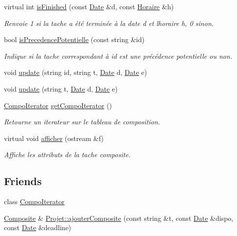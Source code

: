 \begin{DoxyCompactItemize}
virtual int \hyperlink{class_composite_a4dd23b6bafdc87f05f0cb7d19e459f94}{is\+Finished} (const \hyperlink{class_t_i_m_e_1_1_date}{Date} \&d, const \hyperlink{class_t_i_m_e_1_1_horaire}{Horaire} \&h)
\begin{DoxyCompactList}\small\item\em Renvoie 1 si la tache a été terminée à la date d et l\textquotesingle{}horaire h, 0 sinon. \end{DoxyCompactList}\item 
bool \hyperlink{class_composite_a38fbb5005db8a763fec1c8c04f63e1e0}{is\+Precedence\+Potentielle} (const string \&id)
\begin{DoxyCompactList}\small\item\em Indique si la tache correspondant à id est une précédence potentielle ou non. \end{DoxyCompactList}\item 
void \hyperlink{class_composite_ab57477d717423de47a26eb6981ab5914}{update} (string id, string t, \hyperlink{class_t_i_m_e_1_1_date}{Date} d, \hyperlink{class_t_i_m_e_1_1_date}{Date} e)
\item 
void \hyperlink{class_composite_a872bf1fe01072258e23d5e9c25f8b57a}{update} (string t, \hyperlink{class_t_i_m_e_1_1_date}{Date} d, \hyperlink{class_t_i_m_e_1_1_date}{Date} e)
\item 
\hyperlink{class_composite_1_1_compo_iterator}{Compo\+Iterator} \hyperlink{class_composite_a21cf28bf7b0aa43af3804145c7e0b25f}{get\+Compo\+Iterator} ()
\begin{DoxyCompactList}\small\item\em Retourne un iterateur sur le tableau de composition. \end{DoxyCompactList}\item 
virtual void \hyperlink{class_composite_a36da340a18bdf872a180c9657c5996c2}{afficher} (ostream \&f)
\begin{DoxyCompactList}\small\item\em Affiche les attributs de la tache composite. \end{DoxyCompactList}\end{DoxyCompactItemize}
\subsection*{Friends}
\begin{DoxyCompactItemize}
\item 
class \hyperlink{class_composite_a99b8848e80b13dbf3ce3c48846cdf20a}{Compo\+Iterator}
\item 
\hyperlink{class_composite}{Composite} \& \hyperlink{class_composite_a8bbbf008527c73203db26f0f44c5e9d8}{Projet\+::ajouter\+Composite} (const string \&t, const \hyperlink{class_t_i_m_e_1_1_date}{Date} \&dispo, const \hyperlink{class_t_i_m_e_1_1_date}{Date} \&deadline)
\end{DoxyCompactItemize}


